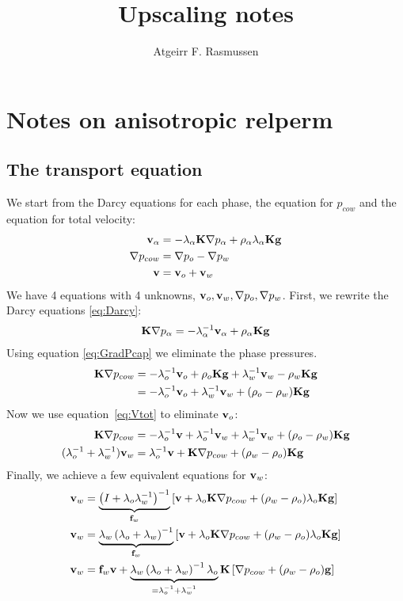 \documentclass[12pt,a4paper]{scrartcl}
\newcommand{\fb}{{\bf f}}
\newcommand{\gb}{{\bf g}}
\newcommand{\vb}{{\bf v}}
\newcommand{\Kb}{{\bf K}}
\begin{document}
\title{Upscaling notes}
\author{Atgeirr F. Rasmussen}


\section{Notes on anisotropic relperm}

\subsection{The transport equation}

We start from the Darcy equations for each phase, the equation for
$p_{cow}$ and the equation for total velocity:
\begin{align}
\vb_\alpha & = -\lambda_\alpha\Kb\nabla p_\alpha + \rho_\alpha\lambda_\alpha\Kb\gb \label{eq:Darcy} \\
\nabla p_{cow} & = \nabla p_o - \nabla p_w \label{eq:GradPcap} \\
\vb & = \vb_o + \vb_w \label{eq:Vtot}
\end{align}
We have 4 equations with 4 unknowns, $\vb_o, \vb_w, \nabla p_o, \nabla
p_w$. First, we rewrite the Darcy equations \eqref{eq:Darcy}:
\begin{align*}
 \Kb\nabla p_\alpha & = -\lambda_\alpha^{-1}\vb_\alpha + \rho_\alpha\Kb\gb \\
\end{align*}
Using equation \eqref{eq:GradPcap} we eliminate the phase pressures.
\begin{align*}
 \Kb\nabla p_{cow} & = -\lambda_o^{-1}\vb_o + \rho_o\Kb\gb 
  + \lambda_w^{-1}\vb_w - \rho_w\Kb\gb  \\
  & = -\lambda_o^{-1}\vb_o 
  + \lambda_w^{-1}\vb_w + (\rho_o - \rho_w)\Kb\gb  \\
\end{align*}
Now we use equation~\eqref{eq:Vtot} to eliminate $\vb_o$:
\begin{align*}
 \Kb\nabla p_{cow}
  & = -\lambda_o^{-1}\vb + \lambda_o^{-1}\vb_w + \lambda_w^{-1}\vb_w + (\rho_o - \rho_w)\Kb\gb  \\
  (\lambda_o^{-1} + \lambda_w^{-1})\vb_w
  & = \lambda_o^{-1}\vb + \Kb\nabla p_{cow} + (\rho_w - \rho_o)\Kb\gb
\end{align*}
Finally, we achieve a few equivalent equations for $\vb_w$:
\begin{align*}
  \vb_w
  & = \underbrace{\left(I + \lambda_o\lambda_w^{-1}\right)^{-1}}_{\fb_w}
  \left[\vb + \lambda_o\Kb\nabla p_{cow} + (\rho_w - \rho_o)\lambda_o\Kb\gb\right] \\
  \vb_w
  & = \underbrace{\lambda_w\left(\lambda_o + \lambda_w\right)^{-1}}_{\fb_w}
  \left[\vb + \lambda_o\Kb\nabla p_{cow} + (\rho_w - \rho_o)\lambda_o\Kb\gb\right] \\
  \vb_w
  & = \fb_w \vb +
  \underbrace{\lambda_w\left(\lambda_o + \lambda_w\right)^{-1}\lambda_o}_{= \lambda_o^{-1} + \lambda_w^{-1}}
  \Kb\left[\nabla p_{cow} + (\rho_w - \rho_o)\gb\right] \\
\end{align*}
\end{document}
